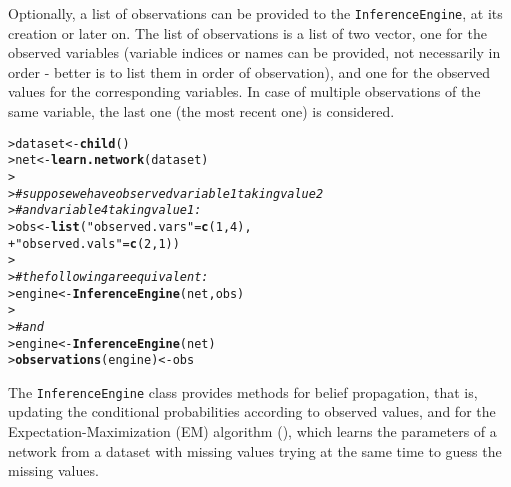 \documentclass{article}\usepackage[]{graphicx}\usepackage[]{color}
\makeatletter
\newcommand{\hlnum}[1]{\textcolor[rgb]{0.686,0.059,0.569}{#1}}%
\newcommand{\hlstr}[1]{\textcolor[rgb]{0.192,0.494,0.8}{#1}}%
\newcommand{\hlcom}[1]{\textcolor[rgb]{0.678,0.584,0.686}{\textit{#1}}}%
\newcommand{\hlstd}[1]{\textcolor[rgb]{0.345,0.345,0.345}{#1}}%
\newcommand{\hlkwb}[1]{\textcolor[rgb]{0.69,0.353,0.396}{#1}}%
\newcommand{\hlkwd}[1]{\textcolor[rgb]{0.737,0.353,0.396}{\textbf{#1}}}%
\newenvironment{kframe}{%
 \def\at@end@of@kframe{}%
 \ifinner\ifhmode%
  \def\at@end@of@kframe{\end{minipage}}%
  \begin{minipage}{\columnwidth}%
 \fi\fi%
 \def\FrameCommand##1{\hskip\@totalleftmargin \hskip-\fboxsep
 \colorbox{shadecolor}{##1}\hskip-\fboxsep
     \hskip-\linewidth \hskip-\@totalleftmargin \hskip\columnwidth}%
 \MakeFramed {\advance\hsize-\width
   \@totalleftmargin\z@ \linewidth\hsize
   \@setminipage}}%
 {\par\unskip\endMakeFramed%
 \at@end@of@kframe}
\newenvironment{knitrout}{}{} %
\newcommand{\Robject}[1]{{\texttt{#1}}}
\makeatother
\begin{document}
Optionally, a list of observations can be provided to the \Robject{InferenceEngine}, at its creation or later on.
The list of observations is a list of two vector, one for the observed variables
(variable indices or names can be provided, not necessarily in order - better is to list them in order of observation),
and one for the observed values for the corresponding variables. In case of multiple observations of the same variable, the last one (the most recent one) is considered.

\begin{knitrout}
\color{fgcolor}\begin{kframe}
\begin{alltt}
\hlstd{> }\hlstd{dataset} \hlkwb{<-} \hlkwd{child}\hlstd{()}
\hlstd{> }\hlstd{net}     \hlkwb{<-} \hlkwd{learn.network}\hlstd{(dataset)}
\hlstd{> }
\hlstd{> }\hlcom{# suppose we have observed variable 1 taking value 2}
\hlstd{> }\hlcom{# and variable 4 taking value 1:}
\hlstd{> }\hlstd{obs} \hlkwb{<-} \hlkwd{list}\hlstd{(}\hlstr{"observed.vars"} \hlstd{=} \hlkwd{c}\hlstd{(}\hlnum{1}\hlstd{,}\hlnum{4}\hlstd{),}
\hlstd{+ }            \hlstr{"observed.vals"} \hlstd{=} \hlkwd{c}\hlstd{(}\hlnum{2}\hlstd{,}\hlnum{1}\hlstd{))}
\hlstd{> }
\hlstd{> }\hlcom{# the following are equivalent:}
\hlstd{> }\hlstd{engine}  \hlkwb{<-} \hlkwd{InferenceEngine}\hlstd{(net, obs)}
\hlstd{> }
\hlstd{> }\hlcom{# and}
\hlstd{> }\hlstd{engine}  \hlkwb{<-} \hlkwd{InferenceEngine}\hlstd{(net)}
\hlstd{> }\hlkwd{observations}\hlstd{(engine)} \hlkwb{<-} \hlstd{obs}
\end{alltt}
\end{kframe}
\end{knitrout}

The \Robject{InferenceEngine} class provides methods for belief propagation, that is, updating
the conditional probabilities according to observed values, and for the Expectation-Maximization (EM) algorithm
(\cite{dempster1977maximum}), which learns the parameters of a network from a dataset with missing values trying
at the same time to guess the missing values.
\end{document}
